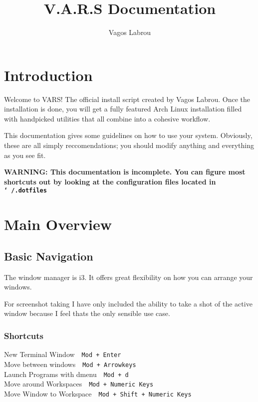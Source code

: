 \documentclass{article}
\author{Vagos Labrou}
\title{V.A.R.S Documentation}
\date{}
\let\src\texttt
\newcommand{\shortcut}[2]{#1~\dotfill{}~\src{#2}\\} %
\newcommand{\me}{Vagos Labrou}
\newcommand{\wm}{i3}
\begin{document}
\maketitle
\tableofcontents

\section{Introduction}

Welcome to VARS! The official install script created by \me. Once the installation 
is done, you will get a fully featured Arch Linux installation filled with handpicked 
utilities that all combine into a cohesive workflow.

This documentation gives some guidelines on how to use your system. Obviously, 
these are all simply reccomendations; you should modify anything and everything
as you see fit.

\textbf{WARNING: This documentation is incomplete. You can figure most shortcuts out 
by looking at the configuration files located in 
\src{\char`~/.dotfiles}}

\section{Main Overview}


\subsection{Basic Navigation}

The window manager is \wm. It offers great flexibility on how you 
can arrange your windows. 

For screenshot taking I have only included the ability to take 
a shot of the active window because I feel thats the only sensible use case.

\subsubsection{Shortcuts}

\begin{minipage}{\textwidth}

\shortcut{New Terminal Window}{Mod + Enter}
\shortcut{Move between windows}{Mod + Arrowkeys}
\shortcut{Launch Programs with dmenu}{Mod + d}
\shortcut{Move around Workspaces}{Mod + Numeric Keys}
\shortcut{Move Window to Workspace}{Mod + Shift + Numeric Keys}

\end{minipage}
\end{document}
